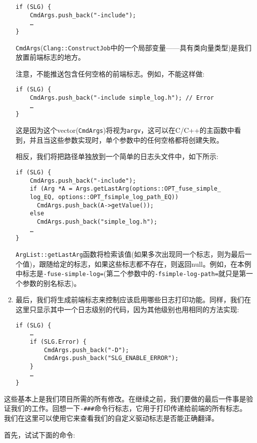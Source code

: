 \begin{enumerate}
\begin{lstlisting}[style=styleCXX]
if (SLG) {
	CmdArgs.push_back("-include");
	…
}
\end{lstlisting}

\texttt{CmdArgs}(\texttt{Clang::ConstructJob}中的一个局部变量——具有类向量类型)是我们放置前端标志的地方。

注意，不能推送包含任何空格的前端标志。例如，不能这样做:

\begin{lstlisting}[style=styleCXX]
if (SLG) {
	CmdArgs.push_back("-include simple_log.h"); // Error
	…
}
\end{lstlisting}

这是因为这个vector(\texttt{CmdArgs})将视为\texttt{argv}，这可以在C/C++的主函数中看到，并且当这些参数实现时，单个参数中的任何空格都将创建失败。

相反，我们将把路径单独放到一个简单的日志头文件中，如下所示:

\begin{lstlisting}[style=styleCXX]
if (SLG) {
	CmdArgs.push_back("-include");
	if (Arg *A = Args.getLastArg(options::OPT_fuse_simple_
	log_EQ, options::OPT_fsimple_log_path_EQ))
 	  CmdArgs.push_back(A->getValue());
	else
	  CmdArgs.push_back("simple_log.h");
	…
}
\end{lstlisting}

\texttt{ArgList::getLastArg}函数将检索该值(如果多次出现同一个标志，则为最后一个值)，跟随给定的标志，如果这些标志都不存在，则返回null。例如，在本例中标志是\texttt{-fuse-simple-log=}(第二个参数中的\texttt{-fsimple-log-path=}就只是第一个参数的别名标志)。

\item 最后，我们将生成前端标志来控制应该启用哪些日志打印功能。同样，我们在这里只显示其中一个日志级别的代码，因为其他级别也用相同的方法实现:

\begin{lstlisting}[style=styleCXX]
if (SLG) {
	…
	if (SLG.Error) {
		CmdArgs.push_back("-D");
		CmdArgs.push_back("SLG_ENABLE_ERROR");
	}
	…
}
\end{lstlisting}

\end{enumerate}

这些基本上是我们项目所需的所有修改。在继续之前，我们要做的最后一件事是验证我们的工作。回想一下\texttt{-\#\#\#}命令行标志，它用于打印传递给前端的所有标志。我们在这里可以使用它来查看我们的自定义驱动标志是否能正确翻译。

首先，试试下面的命令:

